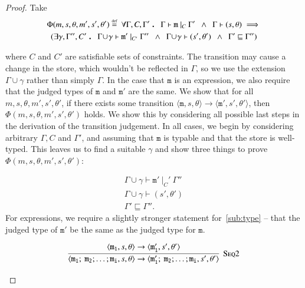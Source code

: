 \documentclass[12pt,a4paper,twoside,openright]{report}
\theoremstyle{definition}
\theoremstyle{dotless}
\newcommand{\transition}[6]{\langle{}\mathtt{#1},#2,#3\rangle{}\rightarrow{}\langle{}\mathtt{#4},#5,#6\rangle}
\newcommand\eqdef{\mathrel{\overset{\makebox[0pt]{\mbox{\normalfont\tiny def}}}{=}}}
\newcommand\qdot{\mathbin{\scalebox{1.5}{.}}\enspace}
\begin{document}
 \begin{proof}
   Take 
   \begin{multline*}
 	\Phi(m, s, \theta, m', s', \theta') \eqdef 
\	\forall\Gamma,C,\Gamma' \qdot
	\Gamma\vdash\mathtt{m}\ |_C\ \Gamma' 
	\enspace\land\enspace\Gamma\vdash (s,\theta)
	\implies \\
   	(\exists\gamma,\Gamma'',C'\qdot
    \Gamma\!\cup\!\gamma\vdash \mathtt{m'}\ |_{C'}\ \Gamma'' 
	\enspace\land\enspace\Gamma\!\cup\!\gamma\vdash (s',\theta')
	\enspace\land\enspace \Gamma'\sqsubseteq\Gamma'')
  \end{multline*} 

  where $C$ and $C'$ are satisfiable sets of constraints. The transition may
  cause a change in the store, which wouldn't be reflected in $\Gamma$, so we
  use the extension $\Gamma\!\cup\!\gamma$ rather than simply $\Gamma$. In the
  case that $\mathtt{m}$ is an expression, we also require that the judged
  types of $\mathtt{m}$ and $\mathtt{m'}$ are the same. We show that for all
  $m, s, \theta, m', s', \theta'$, if there exists some transition
  $\transition{m}{s}{\theta}{m'}{s'}{\theta'}$, then
  $\Phi(m,s,\theta,m',s',\theta')$ holds. We show this by considering all
  possible last steps in the derivation of the transition judgement. In all
  cases, we begin by considering arbitrary $\Gamma, C$ and $\Gamma'$, and
  assuming that $\mathtt{m}$ is typable and that the store is well-typed. This leaves us to find
  a suitable $\gamma$ and show three things to prove $\Phi(m,s,\theta,m',s',\theta')$:

  \begin{gather}
	\Gamma\!\cup\!\gamma\vdash\mathtt{m'}\ |_C'\ \Gamma'' \label{sub:type}\\
	\Gamma\!\cup\!\gamma\vdash(s',\theta') \label{sub:store} \\
	\Gamma' \sqsubseteq \Gamma'' \label{sub:env}.
  \end{gather}
  For expressions, we require a slightly stronger statement for~\eqref{sub:type} -- that
  the judged type of $\mathtt{m'}$ be the same as the judged type for $\mathtt{m}$.
	
  \begin{case}[Seq2]
	$$\infer[\textsc{Seq2}]{
	  \transition{m_1;\ m_2; \dots; m_i}{s}{\theta}{m_1';\ m_2; \dots; m_i}{s'}{\theta'}
	}{
	 \transition{m_1}{s}{\theta}{m_1'}{s'}{\theta'} 
	}$$


\end{case}
\end{proof}
\end{document}

